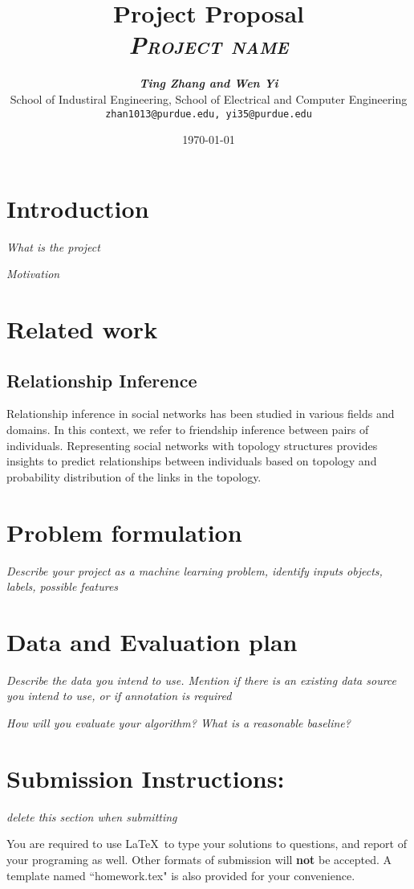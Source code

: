 \documentclass[11pt]{article}
\title{
\textbf{Project Proposal} \\ \textsc{\textit{Project name}} \\
}
\author{
	\textbf{\textit{Ting Zhang and Wen Yi}} \\
	School of Industiral Engineering, School of Electrical and Computer Engineering\\
	\texttt{zhan1013@purdue.edu, yi35@purdue.edu}
}
\date{\today}
\begin{document}
\maketitle


\section{Introduction}
\textit{What is the project}

\textit{Motivation}

\section{Related work}
\subsection{Relationship Inference}
Relationship inference in social networks has been studied in various fields and domains. In this context, we refer to friendship inference between pairs of individuals. Representing social networks with topology structures provides insights to predict relationships  between individuals based on topology and probability distribution of the links in the topology. \cite{liben-nowell_link-prediction_2007} 

\section{Problem formulation}
\textit{Describe your project as a machine learning problem, identify inputs objects, labels, possible features}

\section{Data and Evaluation plan}
\textit{Describe the data you intend to use. Mention if there is an existing data source you intend to use, or if annotation is required}

\textit{How will you evaluate your algorithm? What is a reasonable baseline?}



\section*{Submission Instructions:} 
\textit{delete this section when submitting}

You are required to use \LaTeX \, to type your solutions to questions, and report of your programing as well. Other formats of submission will \textbf{not} be accepted. A template named ``homework.tex" is also provided for your convenience.\\
\end{document}
